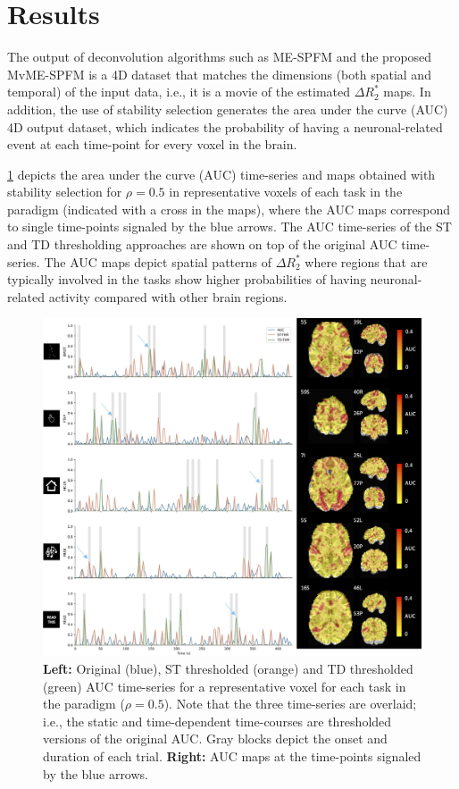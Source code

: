 \section{Results}
\label{sec:multivariate_results}

The output of deconvolution algorithms such as ME-SPFM and the proposed
MvME-SPFM is a 4D dataset that matches the dimensions (both spatial and
temporal) of the input data, i.e., it is a movie of the estimated $\Delta R_2^*$
maps. In addition, the use of stability selection generates the area under the
curve (AUC) 4D output dataset, which indicates the probability of having a
neuronal-related event at each time-point for every voxel in the brain. 

\cref{fig:auc} depicts the area under the curve (AUC) time-series and maps
obtained with stability selection for $\rho=0.5$ in representative voxels of
each task in the paradigm (indicated with a cross in the maps), where the AUC
maps correspond to single time-points signaled by the blue arrows. The AUC
time-series of the ST and TD thresholding approaches are shown on top of the
original AUC time-series. The AUC maps depict spatial patterns of $\Delta R_2^*$
where regions that are typically involved in the tasks show higher probabilities
of having neuronal-related activity compared with other brain regions.

\begin{figure}[ht!]
    \centerline{\includegraphics[width=\textwidth]{figures/multivariate/auc.jpg}}
    \caption{\textbf{Left:} Original (blue), ST thresholded (orange) and TD
    thresholded (green) AUC time-series for a representative voxel for each task
    in the paradigm ($\rho=0.5$). Note that the three time-series are overlaid;
    i.e., the static and time-dependent time-courses are thresholded versions of
    the original AUC. Gray blocks depict the onset and duration of each trial.
    \textbf{Right:} AUC maps at the time-points signaled by the blue arrows.}
\label{fig:auc}
\end{figure}

